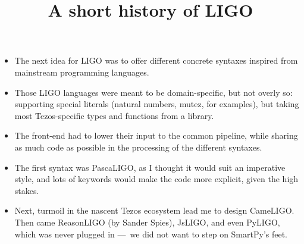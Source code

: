 \documentclass[wide]{slides}
\newcommand{\JsLIGO}[0]{\textsf{JsLIGO}}
\newcommand{\CameLIGO}[0]{\textsf{CameLIGO}}
\begin{document}
\begin{slide}
  \title{A short history of LIGO}

  \begin{itemize}

    \item The next idea for LIGO was to offer different concrete
      syntaxes inspired from mainstream programming languages.

    \item Those LIGO languages were meant to be domain-specific, but
      not overly so: supporting special literals (natural numbers,
      mutez, for examples), but taking most Tezos\hyp{}specific types
      and functions from a library.

    \item The front-end had to lower their input to the common
      pipeline, while sharing as much code as possible in the
      processing of the different syntaxes.

    \item The first syntax was \textsf{PascaLIGO}, as I thought it
      would suit an imperative style, and lots of keywords would make
      the code more explicit, given the high stakes.

    \item Next, turmoil in the nascent Tezos ecosystem lead me to
      design \CameLIGO{}. Then came \textsf{ReasonLIGO} (by Sander
      Spies), \JsLIGO{}, and even \textsf{PyLIGO}, which was never
      plugged in ---~we did not want to step on SmartPy's feet.

  \end{itemize}
\end{slide}
\end{document}
